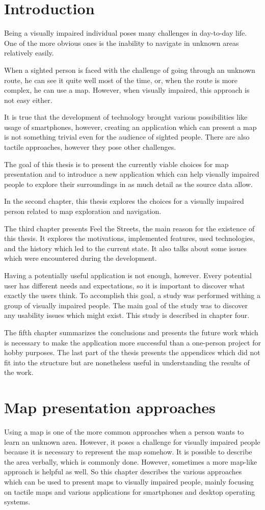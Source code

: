 \documentclass[nolof,digital]{fithesis3}
\begin{document}
\chapter{Introduction}
Being a visually impaired individual poses many challenges in day-to-day life. One of the more obvious ones is the inability to navigate in unknown areas relatively easily.

When a sighted person is faced with the challenge of going through an unknown route, he can see it quite well most of the time, or, when the route is more complex, he can use a map. However, when visually impaired, this approach is not easy either.

It is true that the development of technology brought various possibilities like usage of smartphones, however, creating an application which can present a map is not something trivial even for the audience of sighted people. There are also tactile approaches, however they pose other challenges.

The goal of this thesis is to present the currently viable choices for map presentation and to introduce a new application which can help visually impaired people to explore their surroundings in as much detail as the source data allow.

In the second chapter, this thesis explores the choices for a visually impaired person related to map exploration and navigation.

The third chapter presents Feel the Streets, the main reason for the existence of this thesis. It explores the motivations, implemented features, used technologies, and the history which led to the current state. It also talks about some issues which were encountered during the development.

Having a potentially useful application is not enough, however. Every potential user has different needs and expectations, so it is important to discover what exactly the users think. To accomplish this goal, a study was performed withing a group of visually impaired people. The main goal of the study was to discover any usability issues which might exist. This study is described in chapter four.

The fifth chapter summarizes the conclusions and presents the future work which is necessary to make the application more successful than a one-person project for hobby purposes. The last part of the thesis presents the appendices which did not fit into the structure but are nonetheless useful in understanding the results of the work.
\chapter{Map presentation approaches}
Using a map is one of the more common approaches when a person wants to learn an unknown area. However, it poses a challenge for visually impaired people because it is necessary to represent the map somehow. It is possible to describe the area verbally, which is commonly done. However, sometimes a more map-like approach is helpful as well. So this chapter describes the various approaches which can be used to present maps to visually impaired people, mainly focusing on tactile maps and various applications for smartphones and desktop operating systems.
\end{document}

